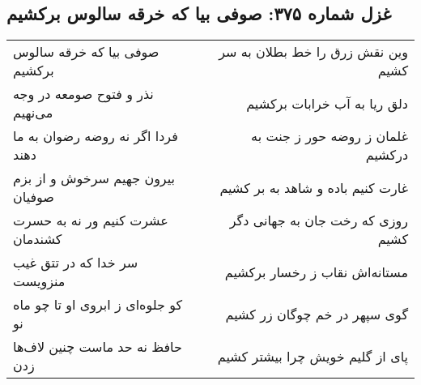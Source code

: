 \begin{center}
\section*{غزل شماره ۳۷۵: صوفی بیا که خرقه سالوس برکشیم}
\label{sec:sh375}
\begin{longtable}{l p{0.5cm} r}
صوفی بیا که خرقه سالوس برکشیم
&&
وین نقش زرق را خط بطلان به سر کشیم
\\
نذر و فتوح صومعه در وجه می‌نهیم
&&
دلق ریا به آب خرابات برکشیم
\\
فردا اگر نه روضه رضوان به ما دهند
&&
غلمان ز روضه حور ز جنت به درکشیم
\\
بیرون جهیم سرخوش و از بزم صوفیان
&&
غارت کنیم باده و شاهد به بر کشیم
\\
عشرت کنیم ور نه به حسرت کشندمان
&&
روزی که رخت جان به جهانی دگر کشیم
\\
سر خدا که در تتق غیب منزویست
&&
مستانه‌اش نقاب ز رخسار برکشیم
\\
کو جلوه‌ای ز ابروی او تا چو ماه نو
&&
گوی سپهر در خم چوگان زر کشیم
\\
حافظ نه حد ماست چنین لاف‌ها زدن
&&
پای از گلیم خویش چرا بیشتر کشیم
\\
\end{longtable}
\end{center}
